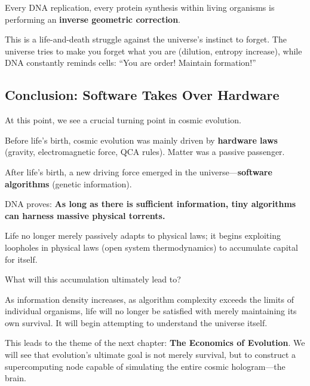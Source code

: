 Every DNA replication, every protein synthesis within living organisms is performing an \textbf{inverse geometric correction}.

This is a life-and-death struggle against the universe's instinct to forget. The universe tries to make you forget what you are (dilution, entropy increase), while DNA constantly reminds cells: ``You are order! Maintain formation!''

\subsection{Conclusion: Software Takes Over Hardware}

At this point, we see a crucial turning point in cosmic evolution.

Before life's birth, cosmic evolution was mainly driven by \textbf{hardware laws} (gravity, electromagnetic force, QCA rules). Matter was a passive passenger.

After life's birth, a new driving force emerged in the universe---\textbf{software algorithms} (genetic information).

DNA proves: \textbf{As long as there is sufficient information, tiny algorithms can harness massive physical torrents.}

Life no longer merely passively adapts to physical laws; it begins exploiting loopholes in physical laws (open system thermodynamics) to accumulate capital for itself.

What will this accumulation ultimately lead to?

As information density increases, as algorithm complexity exceeds the limits of individual organisms, life will no longer be satisfied with merely maintaining its own survival. It will begin attempting to understand the universe itself.

This leads to the theme of the next chapter: \textbf{The Economics of Evolution}. We will see that evolution's ultimate goal is not merely survival, but to construct a supercomputing node capable of simulating the entire cosmic hologram---the brain.

